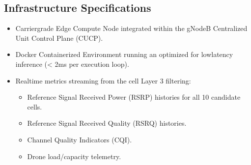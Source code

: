 \documentclass[letterpaper,10pt,english]{sphinxmanual}
\begin{document}
\begin{sphinxVerbatim}[commandchars=\\\{\}]
\end{sphinxVerbatim}


\subsection{Infrastructure Specifications}
\label{\detokenize{deployement:infrastructure-specifications}}\begin{itemize}
\item {} 
\sphinxAtStartPar
{} Carrier\sphinxhyphen{}grade Edge Compute Node integrated within the gNodeB Centralized Unit Control Plane (CU\sphinxhyphen{}CP).

\item {} 
\sphinxAtStartPar
{} Docker Containerized Environment running an  optimized for low\sphinxhyphen{}latency inference (\textless{} 2ms per execution loop).

\item {} 
\sphinxAtStartPar
{} Real\sphinxhyphen{}time metrics streaming from the cell Layer 3 filtering:
\begin{itemize}
\item {} 
\sphinxAtStartPar
Reference Signal Received Power (RSRP) histories for all 10 candidate cells.

\item {} 
\sphinxAtStartPar
Reference Signal Received Quality (RSRQ) histories.

\item {} 
\sphinxAtStartPar
Channel Quality Indicators (CQI).

\item {} 
\sphinxAtStartPar
Drone load/capacity telemetry.

\end{itemize}

\end{itemize}
\end{document}

